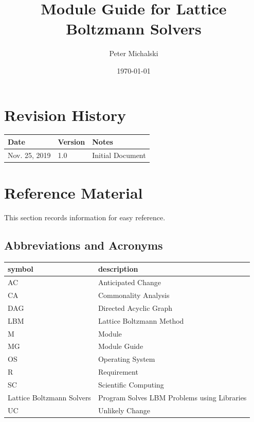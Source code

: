 \documentclass[12pt, titlepage]{article}
\newcommand{\famname}{Lattice Boltzmann Solvers} %
\begin{document}
\title{Module Guide for \famname{}} 
\author{Peter Michalski}
\date{\today}

\maketitle


\section{Revision History}

\begin{tabularx}{\textwidth}{p{3cm}p{2cm}X}
\toprule {\bf Date} & {\bf Version} & {\bf Notes}\\
\midrule
Nov. 25, 2019 & 1.0 & Initial Document\\
\bottomrule
\end{tabularx}

\newpage

\section{Reference Material}

This section records information for easy reference.

\subsection{Abbreviations and Acronyms}

\renewcommand{\arraystretch}{1.2}
\begin{tabular}{l l} 
  \toprule		
  \textbf{symbol} & \textbf{description}\\
  \midrule 
  AC & Anticipated Change\\
  CA & Commonality Analysis\\
  DAG & Directed Acyclic Graph \\
  LBM & Lattice Boltzmann Method\\
  M & Module \\
  MG & Module Guide \\
  OS & Operating System \\
  R & Requirement\\
  SC & Scientific Computing \\
  \famname & Program Solves LBM Problems using Libraries\\
  UC & Unlikely Change \\
  \bottomrule
\end{tabular}\\
\end{document}

